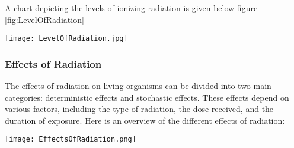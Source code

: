 \documentclass[../introduction.tex]{subfiles}
\begin{document}
        A chart depicting the levels of ionizing radiation is given below figure \ref{fig:LevelOfRadiation}
        \begin{Figure}
            \centering
            \texttt{[image: LevelOfRadiation.jpg]}
            \label{fig:LevelOfRadiation}
        \end{Figure}


    \subsubsection*{\large Effects of Radiation}

        The effects of radiation on living organisms can be divided into two main categories: deterministic effects and 
        stochastic effects. These effects depend on various factors, including the type of radiation, the dose received, 
        and the duration of exposure. Here is an overview of the different effects of radiation:

        \begin{Figure}
            \centering
            \texttt{[image: EffectsOfRadiation.png]}
            \label{fig:EffectsOfRadiation}
        \end{Figure}
\end{document}
